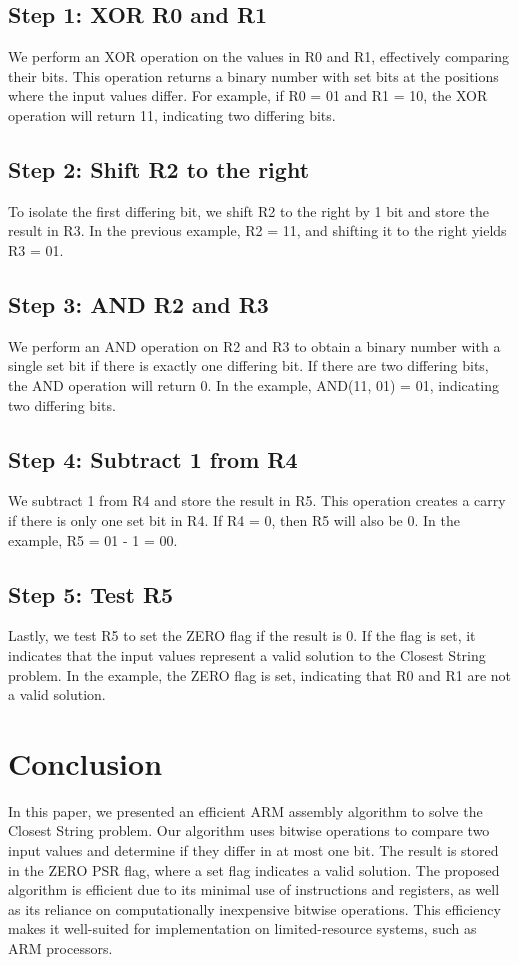 \subsection{Step 1: XOR R0 and R1}
We perform an XOR operation on the values in R0 and R1, effectively comparing their bits. This operation returns a binary number with set bits at the positions where the input values differ. For example, if R0 = 01 and R1 = 10, the XOR operation will return 11, indicating two differing bits.

\subsection{Step 2: Shift R2 to the right}
To isolate the first differing bit, we shift R2 to the right by 1 bit and store the result in R3. In the previous example, R2 = 11, and shifting it to the right yields R3 = 01.

\subsection{Step 3: AND R2 and R3}
We perform an AND operation on R2 and R3 to obtain a binary number with a single set bit if there is exactly one differing bit. If there are two differing bits, the AND operation will return 0. In the example, AND(11, 01) = 01, indicating two differing bits.

\subsection{Step 4: Subtract 1 from R4}
We subtract 1 from R4 and store the result in R5. This operation creates a carry if there is only one set bit in R4. If R4 = 0, then R5 will also be 0. In the example, R5 = 01 - 1 = 00.

\subsection{Step 5: Test R5}
Lastly, we test R5 to set the ZERO flag if the result is 0. If the flag is set, it indicates that the input values represent a valid solution to the Closest String problem. In the example, the ZERO flag is set, indicating that R0 and R1 are not a valid solution.

\section{Conclusion}
In this paper, we presented an efficient ARM assembly algorithm to solve the Closest String problem. Our algorithm uses bitwise operations to compare two input values and determine if they differ in at most one bit. The result is stored in the ZERO PSR flag, where a set flag indicates a valid solution. The proposed algorithm is efficient due to its minimal use of instructions and registers, as well as its reliance on computationally inexpensive bitwise operations. This efficiency makes it well-suited for implementation on limited-resource systems, such as ARM processors.

